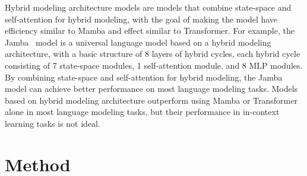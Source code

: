 \documentclass{article}
\theoremstyle{plain}
\theoremstyle{definition}
\theoremstyle{remark}
\begin{document}
Hybrid modeling architecture models are models that combine state-space and self-attention for hybrid modeling, with the goal of making the model have efficiency similar to Mamba and effect similar to Transformer. For example, the Jamba~\cite{lieber2024jamba} model is a universal language model based on a hybrid modeling architecture, with a basic structure of 8 layers of hybrid cycles, each hybrid cycle consisting of 7 state-space modules, 1 self-attention module, and 8 MLP modules. By combining state-space and self-attention for hybrid modeling, the Jamba model can achieve better performance on most language modeling tasks. Models based on hybrid modeling architecture outperform using Mamba or Transformer alone in most language modeling tasks, but their performance in in-context learning tasks is not ideal.








\section{Method}
\end{document}

